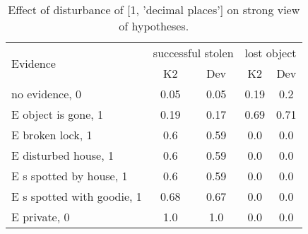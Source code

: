 \begin{table}\begin{tabular}{l|cc|cc}\toprule\multirow{2}{*}{Evidence} & \multicolumn{2}{c}{successful stolen}& \multicolumn{2}{c}{lost object}\\& {K2} & {Dev}& {K2} & {Dev}\\\midrule
no evidence, 0 & 0.05&0.05&0.19&0.2\\E object is gone, 1 & 0.19&0.17&0.69&0.71\\E broken lock, 1 & 0.6&0.59&0.0&0.0\\E disturbed house, 1 & 0.6&0.59&0.0&0.0\\E s spotted by house, 1 & 0.6&0.59&0.0&0.0\\E s spotted with goodie, 1 & 0.68&0.67&0.0&0.0\\E private, 0 & 1.0&1.0&0.0&0.0\\\bottomrule\end{tabular}\caption{Effect of disturbance of [1, 'decimal places'] on strong view of hypotheses.}\end{table}